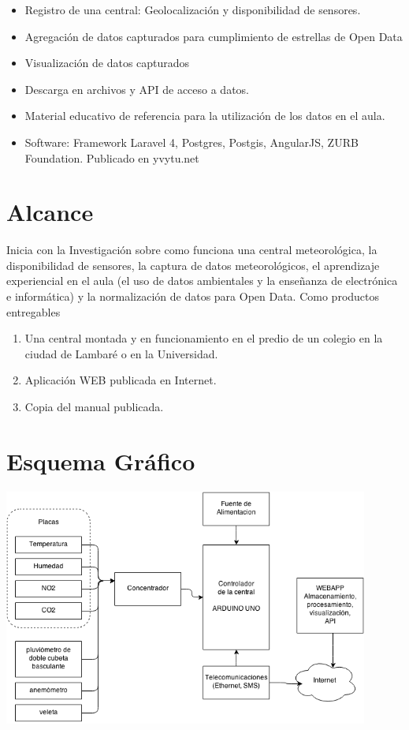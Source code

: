 \documentclass[a4paper,11pt, spanish]{article}
\begin{document}
\begin{enumerate}
\begin{itemize}
\item Registro de una central: Geolocalización y disponibilidad de sensores.
\item Agregación de datos capturados para cumplimiento de estrellas de Open Data
\item Visualización de datos capturados
\item Descarga en archivos y API de acceso a datos.
\item Material educativo de referencia para la utilización de los datos en el aula.
\item Software: Framework Laravel 4, Postgres, Postgis, AngularJS, ZURB Foundation. Publicado en yvytu.net
\end{itemize}
\end{enumerate}

\section{Alcance}
Inicia con la Investigación sobre como funciona una central meteorológica, la disponibilidad de sensores, la captura de datos meteorológicos, el aprendizaje experiencial en el aula (el uso de datos ambientales y la enseñanza de electrónica e informática) y la normalización de datos para Open Data.
Como productos entregables
\begin{enumerate}
\item Una central montada y en funcionamiento en el predio de un colegio en la ciudad de Lambaré o en la Universidad.
\item Aplicación WEB publicada en Internet.
\item Copia del manual publicada.
\end{enumerate}

\section{Esquema Gráfico}
\includegraphics[width=0.9\textwidth,natwidth=648,natheight=421]{Central.png}
\end{document}
